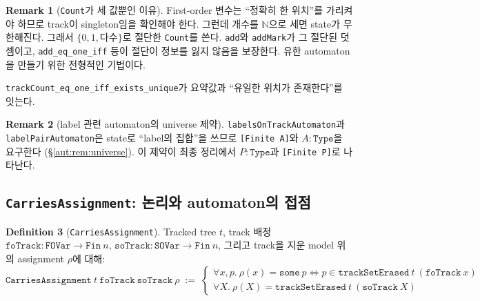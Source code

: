 \documentclass[11pt]{article}
\theoremstyle{definition}
\newtheorem{definition}{Definition}[section]
\newtheorem{remark}[definition]{Remark}
\theoremstyle{plain}
\newcommand{\lean}[1]{\texttt{#1}}
\begin{document}
\begin{remark}[\lean{Count}가 세 값뿐인 이유]
First-order 변수는 ``정확히 한 위치''를 가리켜야 하므로 track이 singleton임을
확인해야 한다. 그런데 개수를 $\mathbb{N}$으로 세면 state가 무한해진다. 그래서
$\{0, 1, \text{다수}\}$로 절단한 \lean{Count}를 쓴다. \lean{add}와
\lean{addMark}가 그 절단된 덧셈이고, \lean{add\_eq\_one\_iff} 등이 절단이
정보를 잃지 않음을 보장한다. 유한 automaton을 만들기 위한 전형적인 기법이다.

\lean{trackCount\_eq\_one\_iff\_exists\_unique}가 요약값과 ``유일한 위치가
존재한다''를 잇는다.
\end{remark}

\begin{remark}[label 관련 automaton의 universe 제약]
\lean{labelsOnTrackAutomaton}과 \lean{labelPairAutomaton}은 state로 ``label의
집합''을 쓰므로 \lean{[Finite A]}와 $A : \lean{Type}$을 요구한다
(\S\ref{aut:rem:universe}). 이 제약이 최종 정리에서 $P : \lean{Type}$과
\lean{[Finite P]}로 나타난다.
\end{remark}

\subsection{\lean{CarriesAssignment}: 논리와 automaton의 접점}

\begin{definition}[\lean{CarriesAssignment}]
\label{aut:def:carriesassignment}
Tracked tree $t$, track 배정
$\lean{foTrack} : \lean{FOVar} \to \lean{Fin}\ n$,
$\lean{soTrack} : \lean{SOVar} \to \lean{Fin}\ n$, 그리고 track을 지운 model
위의 assignment $\rho$에 대해:
\[
  \lean{CarriesAssignment}\ t\ \lean{foTrack}\ \lean{soTrack}\ \rho
  \;:=\;
  \begin{cases}
    \forall x, p.\ \rho(x) = \lean{some}\ p \iff p \in \lean{trackSetErased}\ t\ (\lean{foTrack}\ x) \\
    \forall X.\ \rho(X) = \lean{trackSetErased}\ t\ (\lean{soTrack}\ X)
  \end{cases}
\]
\end{definition}
\end{document}
